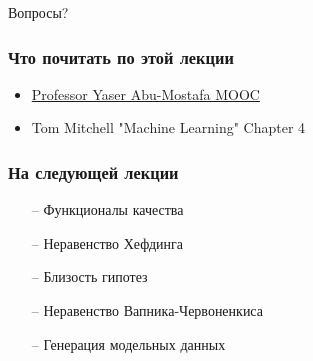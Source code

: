 \documentclass[10pt]{beamer}
\begin{document}
%
%
%
%
%

\begin{frame}[standout]
  Вопросы?
\end{frame}

\appendix

\begin{frame}\frametitle{Что почитать по этой лекции}
  \begin{itemize}
    \item \href{http://work.caltech.edu/telecourse.html}{Professor Yaser Abu-Mostafa MOOC}
    \item Tom Mitchell "Machine Learning" Chapter 4
  \end{itemize}
\end{frame}

\begin{frame}\frametitle{На следующей лекции}
	\begin{itemize}
    	\item[--] Функционалы качества
    	\item[--] Неравенство Хефдинга
    	\item[--] Близость гипотез
    	\item[--] Неравенство Вапника-Червоненкиса
    	\item[--] Генерация модельных данных    	    	
	\end{itemize}
\end{frame}
\end{document}
